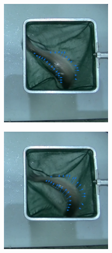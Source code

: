 \begin{enumerate}
\begin{figure}[H]
\begin{subfigure}[b]{\textwidth}
\begin{subfigure}[b]{0.25\textwidth}
                    \label{fig:Opt2}
                \end{subfigure}
                \begin{subfigure}[b]{0.25\textwidth}
                    \centering
                    \includegraphics[width=0.8\textwidth]{images/6/ConOptical3.png}
                    \label{fig:Opt3}
                \end{subfigure}
                \begin{subfigure}[b]{0.25\textwidth}
                    \centering
                    \includegraphics[width=0.8\textwidth]{images/6/ConOptical4.png}

\end{subfigure}
\end{subfigure}
\end{figure}
\end{enumerate}
